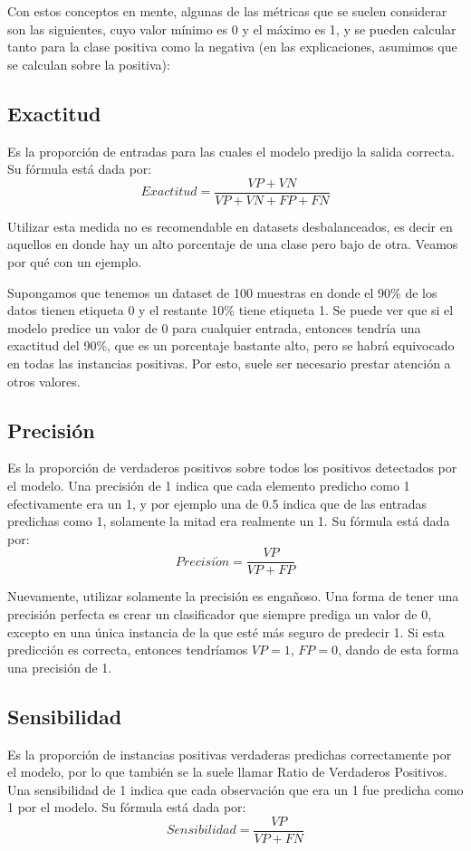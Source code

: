 \documentclass[../../main.tex]{subfiles}
\begin{document}
Con estos conceptos en mente, algunas de las métricas que se suelen considerar son las
siguientes, cuyo valor mínimo es 0 y el máximo es 1, y se pueden calcular tanto para la
clase positiva como la negativa (en las explicaciones, asumimos que se calculan sobre la
positiva):

\subsection{Exactitud}
Es la proporción de entradas para las cuales el modelo predijo la salida correcta.
Su fórmula está dada por:
\[
    Exactitud = \frac{VP + VN}{VP + VN + FP + FN}
\]

Utilizar esta medida no es recomendable en datasets desbalanceados, es decir en aquellos
en donde hay un alto porcentaje de una clase pero bajo de otra. Veamos por qué con un
ejemplo.

Supongamos que tenemos un dataset de 100 muestras en donde el 90\% de los datos tienen
etiqueta 0 y el restante 10\% tiene etiqueta 1. Se puede ver que si el modelo predice un
valor de 0 para cualquier entrada, entonces tendría una exactitud del 90\%, que es un
porcentaje bastante alto, pero se habrá equivocado en todas las instancias positivas.
Por esto, suele ser necesario prestar atención a otros valores.

\subsection{Precisión}
Es la proporción de verdaderos positivos sobre todos los positivos detectados por el
modelo. Una precisión de 1 indica que cada elemento predicho como 1 efectivamente
era un 1, y por ejemplo una de 0.5 indica que de las entradas predichas como 1,
solamente la mitad era realmente un 1. Su fórmula está dada por:
\[
    Precisi\acute{o}n = \frac{VP}{VP + FP}
\]

Nuevamente, utilizar solamente la precisión es engañoso. Una forma de tener una precisión
perfecta es crear un clasificador que siempre prediga un valor de 0, excepto en una única
instancia de la que esté más seguro de predecir 1. Si esta predicción es correcta,
entonces tendríamos \(VP=1\), \(FP=0\), dando de esta forma una precisión de 1.

\subsection{Sensibilidad}
Es la proporción de instancias positivas verdaderas predichas correctamente por el modelo,
por lo que también se la suele llamar Ratio de Verdaderos Positivos. Una sensibilidad de 1
indica que cada observación que era un 1 fue predicha como 1 por el modelo. Su fórmula
está dada por:
\[
    Sensibilidad = \frac{VP}{VP + FN}
\]
\end{document}
